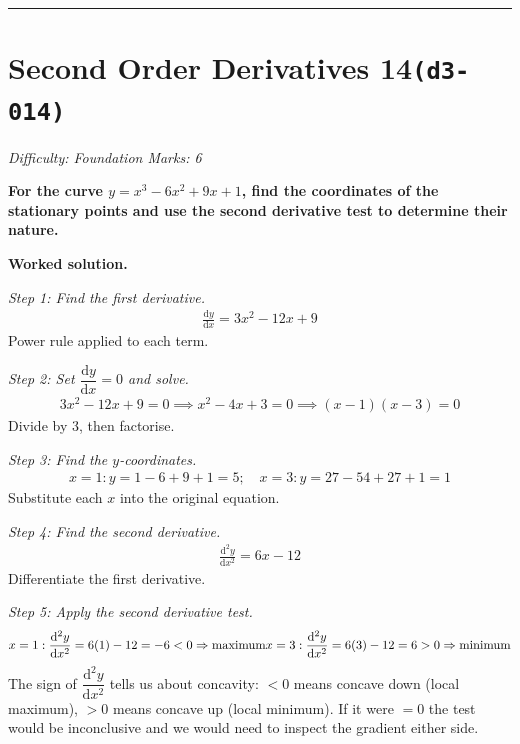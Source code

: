 \documentclass[11pt]{article}
\newcommand{\question}[1]{\par\medskip\noindent\textbf{#1}\par}
\begin{document}
\medskip\hrule

\section*{Second Order Derivatives 14\quad\small\texttt{(d3-014)}}
\textit{Difficulty: Foundation \quad\textbar\quad Marks: 6}

\question{For the curve \( y = x^3 - 6x^2 + 9x + 1 \), find the coordinates of the stationary points and use the second derivative test to determine their nature.}

\textbf{Worked solution.}

\textit{Step 1: Find the first derivative.}
\[\begin{gathered}
\frac{\mathrm{d}y}{\mathrm{d}x} = 3x^2 - 12x + 9
\end{gathered}\]
Power rule applied to each term.

\textit{Step 2: Set \( \dfrac{\mathrm{d}y}{\mathrm{d}x} = 0 \) and solve.}
\[\begin{gathered}
3x^2 - 12x + 9 = 0 \implies x^2 - 4x + 3 = 0 \implies (x-1)(x-3) = 0
\end{gathered}\]
Divide by 3, then factorise.

\textit{Step 3: Find the \( y \)-coordinates.}
\[\begin{gathered}
x=1: y = 1 - 6 + 9 + 1 = 5; \quad x=3: y = 27 - 54 + 27 + 1 = 1
\end{gathered}\]
Substitute each \( x \) into the original equation.

\textit{Step 4: Find the second derivative.}
\[\begin{gathered}
\frac{\mathrm{d}^2y}{\mathrm{d}x^2} = 6x - 12
\end{gathered}\]
Differentiate the first derivative.

\textit{Step 5: Apply the second derivative test.}
\[\begin{gathered}
x=1: \frac{\mathrm{d}^2y}{\mathrm{d}x^2} = 6(1) - 12 = -6 < 0 \Rightarrow \text{maximum} \newline x=3: \frac{\mathrm{d}^2y}{\mathrm{d}x^2} = 6(3) - 12 = 6 > 0 \Rightarrow \text{minimum}
\end{gathered}\]
The sign of \( \dfrac{\mathrm{d}^2y}{\mathrm{d}x^2} \) tells us about concavity: \(< 0\) means concave down (local maximum), \(> 0\) means concave up (local minimum). If it were \(= 0\) the test would be inconclusive and we would need to inspect the gradient either side.
\end{document}
